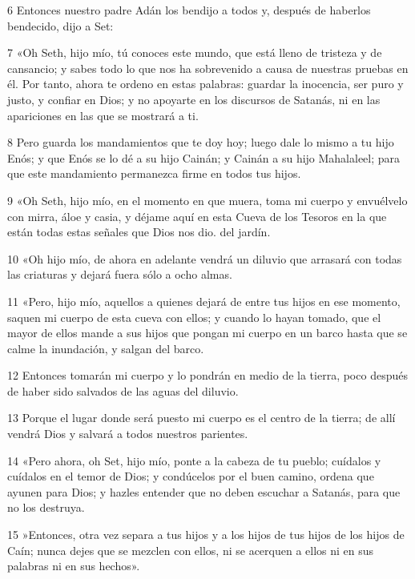 \par 6 Entonces nuestro padre Adán los bendijo a todos y, después de haberlos bendecido, dijo a Set:

\par 7 «Oh Seth, hijo mío, tú conoces este mundo, que está lleno de tristeza y de cansancio; y sabes todo lo que nos ha sobrevenido a causa de nuestras pruebas en él. Por tanto, ahora te ordeno en estas palabras: guardar la inocencia, ser puro y justo, y confiar en Dios; y no apoyarte en los discursos de Satanás, ni en las apariciones en las que se mostrará a ti.

\par 8 Pero guarda los mandamientos que te doy hoy; luego dale lo mismo a tu hijo Enós; y que Enós se lo dé a su hijo Cainán; y Cainán a su hijo Mahalaleel; para que este mandamiento permanezca firme en todos tus hijos.

\par 9 «Oh Seth, hijo mío, en el momento en que muera, toma mi cuerpo y envuélvelo con mirra, áloe y casia, y déjame aquí en esta Cueva de los Tesoros en la que están todas estas señales que Dios nos dio. del jardín.

\par 10 «Oh hijo mío, de ahora en adelante vendrá un diluvio que arrasará con todas las criaturas y dejará fuera sólo a ocho almas.

\par 11 «Pero, hijo mío, aquellos a quienes dejará de entre tus hijos en ese momento, saquen mi cuerpo de esta cueva con ellos; y cuando lo hayan tomado, que el mayor de ellos mande a sus hijos que pongan mi cuerpo en un barco hasta que se calme la inundación, y salgan del barco.

\par 12 Entonces tomarán mi cuerpo y lo pondrán en medio de la tierra, poco después de haber sido salvados de las aguas del diluvio.

\par 13 Porque el lugar donde será puesto mi cuerpo es el centro de la tierra; de allí vendrá Dios y salvará a todos nuestros parientes.

\par 14 «Pero ahora, oh Set, hijo mío, ponte a la cabeza de tu pueblo; cuídalos y cuídalos en el temor de Dios; y condúcelos por el buen camino, ordena que ayunen para Dios; y hazles entender que no deben escuchar a Satanás, para que no los destruya.

\par 15 »Entonces, otra vez separa a tus hijos y a los hijos de tus hijos de los hijos de Caín; nunca dejes que se mezclen con ellos, ni se acerquen a ellos ni en sus palabras ni en sus hechos».

